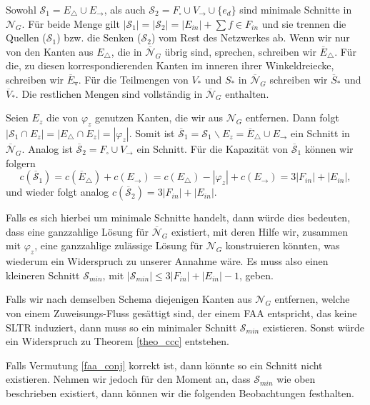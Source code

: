 Sowohl $\mathcal{S}_1 = E_\triangle \cup E_{\to}$, als auch $\mathcal{S}_2 = F_\square \cup V_{\to} \cup \{e_{d}\}$ sind minimale Schnitte in $\mathcal{N}_G$. Für beide Menge gilt $|\mathcal{S}_1| = |\mathcal{S}_2| = |E_{in}| + \sum{f \in F_{in}}$ und sie trennen die Quellen ($\mathcal{S}_1$) bzw. die Senken ($\mathcal{S}_2$) vom Rest des Netzwerkes ab. Wenn wir nur von den Kanten aus $E_\triangle$, die in $\overline{\mathcal{N}}_G$ übrig sind, sprechen, schreiben wir $\overline{E}_\triangle$. Für die, zu diesen korrespondierenden Kanten im inneren ihrer Winkeldreiecke, schreiben wir $\overline{E}_\triangledown$. Für die Teilmengen von $V_*$ und $S_*$ in $\overline{\mathcal{N}}_G$ schreiben wir $\overline{S}_*$ und $\overline{V}_*$. Die restlichen Mengen sind vollständig in $\overline{\mathcal{N}}_G$ enthalten.

Seien $E_z$ die von $\varphi_z$ genutzen Kanten, die wir aus $\mathcal{N}_G$ entfernen. Dann folgt $|\mathcal{S}_1 \cap E_z| = |E_\triangle \cap E_z| = |\varphi_z|$. Somit ist $\overline{\mathcal{S}}_1 = \mathcal{S}_1 \backslash E_z = \overline{E}_\triangle \cup E_\to$ ein Schnitt in $\overline{\mathcal{N}}_G$. Analog ist $\overline{\mathcal{S}}_2 = F_\square \cup V_{\to}$ ein Schnitt. Für die Kapazität von $\overline{\mathcal{S}}_1$ können wir folgern 
$$ c(\overline{\mathcal{S}}_1) = c(\overline{E}_\triangle) + c(E_\to) = c(E_\triangle) - |\varphi_z| + c(E_\to) = 3|F_{in}| + |E_{in}|,$$
und wieder folgt analog $c(\overline{\mathcal{S}}_2) = 3|F_{in}| + |E_{in}|$.

Falls es sich hierbei um minimale Schnitte handelt, dann würde dies bedeuten, dass eine ganzzahlige Lösung für $\overline{\mathcal{N}}_G$ existiert, mit deren Hilfe wir, zusammen mit $\varphi_z$, eine ganzzahlige zulässige Lösung für $\mathcal{N}_G$ konstruieren könnten, was wiederum ein Widerspruch zu unserer Annahme wäre. Es muss also einen kleineren Schnitt $\mathcal{S}_{min}$, mit $|\mathcal{S}_{min}| \leq 3|F_{in}| + |E_{in}| - 1$, geben. 

\begin{remark}
Falls wir nach demselben Schema diejenigen Kanten aus $\mathcal{N}_G$ entfernen, welche von einem Zuweisungs-Fluss gesättigt sind, der einem FAA entspricht, das keine SLTR induziert, dann muss so ein minimaler Schnitt $\mathcal{S}_{min}$ existieren. Sonst würde ein Widerspruch zu Theorem \ref{theo_ccc} entstehen.
\end{remark}

Falls Vermutung \ref{faa_conj} korrekt ist, dann könnte so ein Schnitt nicht existieren. Nehmen wir jedoch für den Moment an, dass $\mathcal{S}_{min}$ wie oben beschrieben existiert, dann können wir die folgenden Beobachtungen festhalten.


